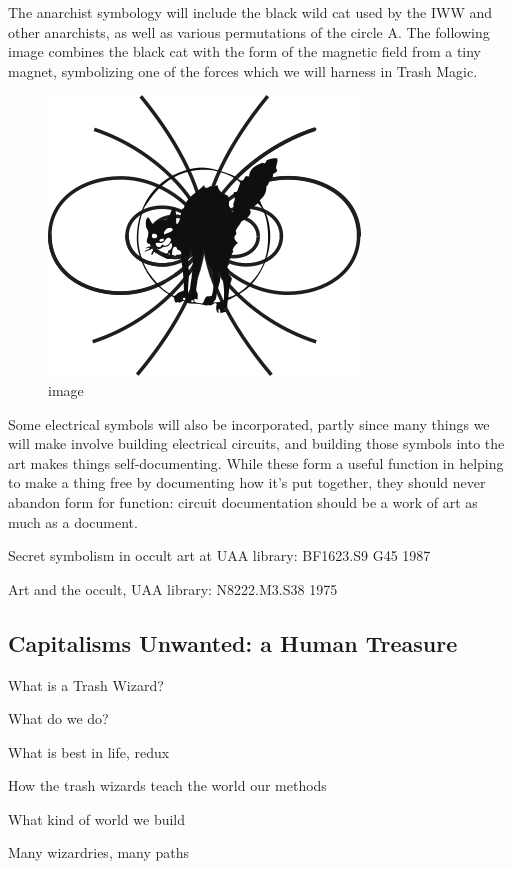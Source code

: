 The anarchist symbology will include the black wild cat used by the IWW
and other anarchists, as well as various permutations of the circle A.
The following image combines the black cat with the form of the magnetic
field from a tiny magnet, symbolizing one of the forces which we will
harness in Trash Magic.

\begin{figure}[htbp]
\centering
\includegraphics{images/cat3.png}
\caption{image}
\end{figure}

Some electrical symbols will also be incorporated, partly since many
things we will make involve building electrical circuits, and building
those symbols into the art makes things self-documenting. While these
form a useful function in helping to make a thing free by documenting
how it's put together, they should never abandon form for function:
circuit documentation should be a work of art as much as a document.

Secret symbolism in occult art at UAA library: BF1623.S9 G45 1987

Art and the occult, UAA library: N8222.M3.S38 1975

\subsection{Capitalisms Unwanted: a Human
Treasure}\label{capitalisms-unwanted-a-human-treasure}

What is a Trash Wizard?

What do we do?

What is best in life, redux

How the trash wizards teach the world our methods

What kind of world we build

Many wizardries, many paths

